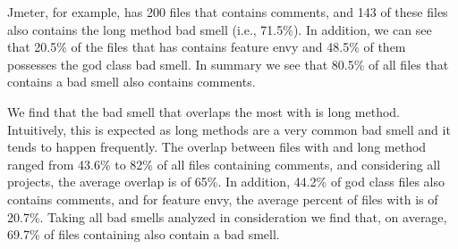 {Jmeter, for example, has 200 files that contains \SATD comments, and 143 of these files also contains the long method bad smell (i.e., 71.5\%). In addition, we can see that 20.5\% of the files that has \SATD contains feature envy and 48.5\% of them possesses the god class bad smell. In summary we see that 80.5\% of all files that contains a bad smell also contains \SATD comments.     

We find that the bad smell that overlaps the most with \SATD is long method. Intuitively, this is expected as long methods are a very common bad smell and it tends to happen frequently. The overlap between files with \SATD and long method ranged from 43.6\% to 82\% of all files containing \SATD comments, and considering all projects, the average overlap is of 65\%. In addition, 44.2\% of god class files also contains \SATD comments, and for feature envy, the average percent of files with \SATD is of 20.7\%. Taking all bad smells analyzed in consideration we find that, on average, 69.7\% of files containing \SATD also contain a bad smell. 


}
